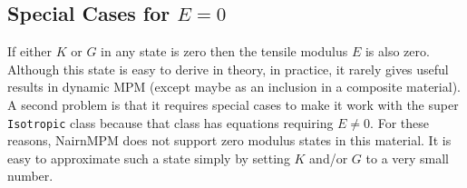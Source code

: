 \documentclass[11pt]{article}
\def\code#1{{\small\tt #1}}
\begin{document}
\subsection{Special Cases for $E=0$}

If either $K$ or $G$ in any state is zero then the tensile modulus $E$ is also zero. Although this state is easy to derive in theory, in practice, it rarely gives useful results in dynamic MPM (except maybe as an inclusion in a composite material). A second problem is that it requires special cases to make it work with the super \code{Isotropic} class because that class has equations requiring $E\ne 0$. For these reasons, NairnMPM does not support zero modulus states in this material. It is easy to approximate such a state simply by setting $K$ and/or $G$ to a very small number.
\end{document}

